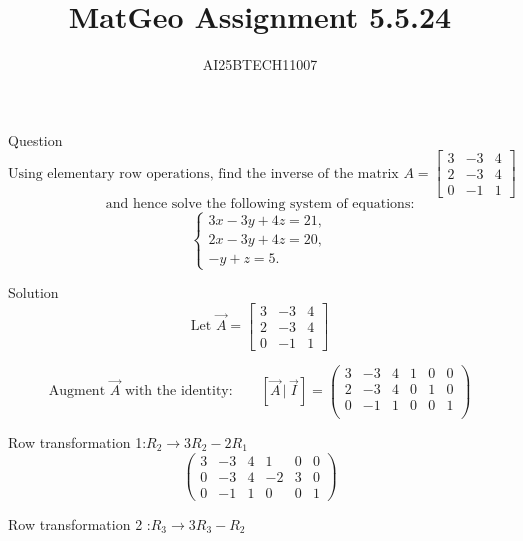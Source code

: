 \documentclass{beamer}
\title 
{MatGeo Assignment 5.5.24}
\author
{AI25BTECH11007}
\begin{document}
\frame{\titlepage}
\begin{frame}{Question}
    \[
\text{Using elementary row operations, find the inverse of the matrix }
A = \begin{bmatrix}
3 & -3 & 4 \\
2 & -3 & 4 \\
0 & -1 & 1
\end{bmatrix}
\]
\[
\text{and hence solve the following system of equations:}
\]
\[
\begin{cases}
3x - 3y + 4z = 21, \\
2x - 3y + 4z = 20, \\
- y + z = 5.
\end{cases}
\]
\end{frame}

\begin{frame}{Solution}
    \[
\text{Let }\vec{A}=\begin{bmatrix}
3 & -3 & 4\\[4pt]
2 & -3 & 4\\[4pt]
0 & -1 & 1
\end{bmatrix}
\]

\[
\text{Augment } \vec{A} \text{ with the identity:}
\qquad
[\vec{A}\,|\,\vec{I}] =
\left(
\begin{array}{ccc|ccc}
3 & -3 & 4 & 1 & 0 & 0 \\[4pt]
2 & -3 & 4 & 0 & 1 & 0 \\[4pt]
0 & -1 & 1 & 0 & 0 & 1 \\
\end{array}
\right)
\]

Row transformation 1:\quad $R_2 \to 3R_2 - 2R_1$
\[
\left(
\begin{array}{ccc|ccc}
3 & -3 & 4 & 1 & 0 & 0 \\[4pt]
0 & -3 & 4 & -2 & 3 & 0 \\[4pt]
0 & -1 & 1 & 0 & 0 & 1
\end{array}
\right)
\]

Row transformation 2 :\quad $R_3 \to 3R_3 - R_2$
\end{frame}
\end{document}
